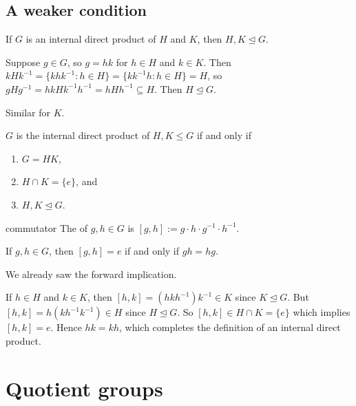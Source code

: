 \documentclass[12pt,letterpaper]{report}
\begin{document}
\pagebreak
\subsection{A weaker condition}

\begin{lem}{}{}
  If $G$ is an internal direct product of $H$ and $K$, then $H, K \trianglelefteq G$.
\end{lem}

\begin{thmproof}
  Suppose $g \in G$, so $g = hk$ for $h \in H$ and $k \in K$.
  Then $kHk^{-1} = \{khk^{-1} : h \in H\} = \{kk^{-1}h : h \in H\} = H$, so
  $gHg^{-1} = hkHk^{-1}h^{-1} = hHh^{-1} \subseteq H$.
  Then $H \trianglelefteq G$.

  Similar for $K$.
\end{thmproof}

\begin{prop}{}{}
  $G$ is the internal direct product of $H, K \leq G$ if and only if
  \begin{enumerate}
    \item $G = HK$,
    \item $H \cap K = \{e\}$, and
    \item $H, K \trianglelefteq G$.
  \end{enumerate}
\end{prop}

\begin{defn}{commutator}{}
  The  of $g, h \in G$ is $[g, h] := g \cdot h \cdot g^{-1} \cdot h^{-1}$.
\end{defn}

\begin{lem}{}{}
  If $g, h \in G$, then $[g, h] = e$ if and only if $gh = hg$.
\end{lem}

\begin{thmproof}
  We already saw the forward implication.

  If $h \in H$ and $k \in K$, then $[h, k] = (hkh^{-1})k^{-1} \in K$ since $K \trianglelefteq G$.
  But $[h, k] = h(kh^{-1}k^{-1}) \in H$ since $H \trianglelefteq G$.
  So $[h, k] \in H \cap K = \{e\}$ which implies $[h, k] = e$.
  Hence $hk = kh$, which completes the definition of an internal direct product.
\end{thmproof}


\section{Quotient groups}
\end{document}

